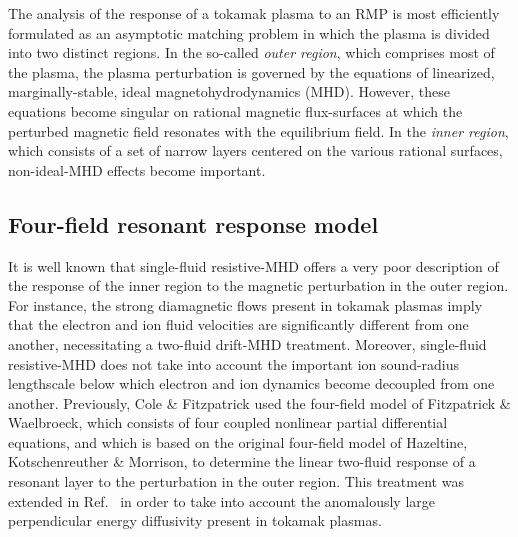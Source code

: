 \documentclass[12pt,prb,aps]{revtex4-1}
\begin{document}
The analysis  of the response of a tokamak plasma to an RMP  is most efficiently formulated as an asymptotic matching problem in which the  plasma is  divided into two distinct regions.\cite{fkr}    In the so-called {\em outer region}, which comprises most
of the plasma, the plasma perturbation is governed by the equations of linearized, marginally-stable, ideal magnetohydrodynamics (MHD).
However, these equations become singular on    rational  magnetic flux-surfaces at which the perturbed magnetic field resonates with the equilibrium field. In the {\em inner region}, which
consists of a set of narrow layers centered on the various rational surfaces, non-ideal-MHD effects   become important.

\subsection{Four-field resonant response model}
It is well known that single-fluid resistive-MHD offers a very poor description of
the response of the inner region to the magnetic perturbation in the outer region. 
For instance, the strong  diamagnetic flows present in tokamak plasmas imply that the  electron and ion fluid velocities are significantly different from one another,
necessitating a two-fluid drift-MHD treatment.\cite{ara} Moreover, single-fluid resistive-MHD does not take  into account the important  ion sound-radius lengthscale below which electron and ion dynamics become decoupled from one another.\cite{drake,wal} Previously, Cole \& Fitzpatrick\cite{cole} used the four-field model
of Fitzpatrick \& Waelbroeck,\cite{fw} which consists of four coupled nonlinear partial differential equations,
and which is based on the original four-field model of Hazeltine, Kotschenreuther \& Morrison, \cite{haz} 
to determine the linear two-fluid response of a resonant layer to the perturbation in the outer region. This treatment was extended in Ref.~ in order  to take into account the
 anomalously large perpendicular  energy diffusivity  present in tokamak plasmas. 
 
\end{document}
